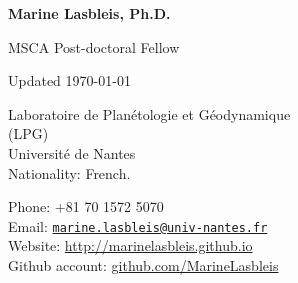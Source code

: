 \documentclass{cv}
\author{Marine Lasbleis}
\begin{document}
\begin{minipage}{0.6\textwidth}
{\Large{\textbf{Marine Lasbleis, Ph.D.}

MSCA Post-doctoral Fellow}}
\end{minipage}
\hfill
\begin{minipage}{0.38\textwidth}
\begin{flushright}
Updated \today
\end{flushright}
\end{minipage}
\vspace{0.2cm}

\begin{minipage}{0.5\linewidth}
Laboratoire de Plan\'etologie et G\'eodynamique\\
(LPG)\\
Universit\'e de Nantes\\
Nationality: French.
\end{minipage}
\hfill
  \begin{minipage}{0.45\linewidth}
	Phone: +81 70 1572 5070\\%
	Email: \texttt{\href{mailto:marine.lasbleis@univ-nantes.fr}{marine.lasbleis@univ-nantes.fr}}\\
	Website:  \href{http://marinelasbleis.github.io}{http://marinelasbleis.github.io}\\
	Github account: \href{https://github.com/MarineLasbleis}{github.com/MarineLasbleis}\\

\end{minipage}






\end{document}
